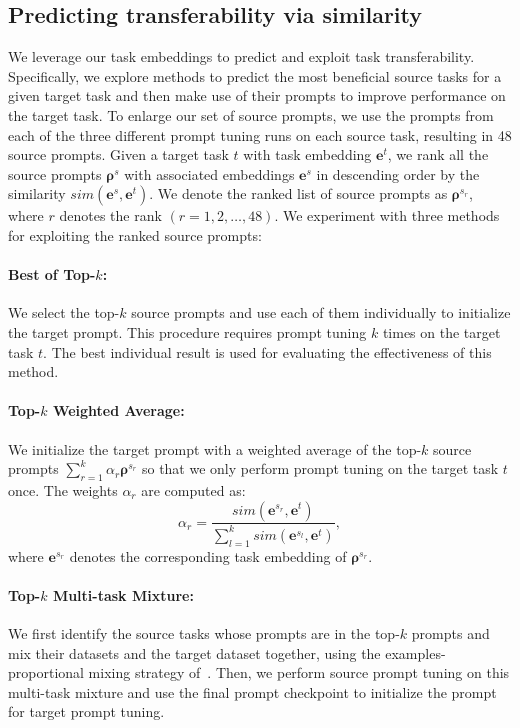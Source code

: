 \subsection{Predicting transferability via similarity}
\label{sec:predict_and_exploit}
We leverage our task embeddings to predict and exploit task transferability. Specifically, we explore methods to predict the most beneficial source tasks for a given target task and then make use of their prompts to improve performance on the target task. To enlarge our set of source prompts, we use the prompts from each of the three different prompt tuning runs on each source task, resulting in 48 source prompts. Given a target task $t$ with task embedding $\bm{e}^t$, we rank all the source prompts $\bm{\rho}^{s}$ with associated embeddings $\bm{e}^{s}$ in descending order by the similarity $sim(\bm{e}^{s}, \bm{e}^{t})$. We denote the ranked list of source prompts as $\bm{\rho}^{s_r}$, where $r$ denotes the rank $(r=1,2,\ldots, 48)$. We experiment with three methods for exploiting the ranked source prompts:

\paragraph{{\small \sc \textbf{Best of Top-$k$}}:} We select the top-$k$ source prompts and use each of them individually to initialize the target prompt. This procedure requires prompt tuning $k$ times on the target task $t$. The best individual result is used for evaluating the effectiveness of this method.

\paragraph{{\small \sc \textbf{Top-$k$ Weighted Average}}:} We initialize the target prompt with a weighted average of the \mbox{top-$k$} source prompts $\sum_{r=1}^{k} \alpha_{r} \bm{\rho}^{s_r}$ so that we only perform prompt tuning on the target task $t$ once. The weights $\alpha_{r}$ are computed as:
\[\alpha_{r} = \dfrac{sim(\bm{e}^{s_r}, \bm{e}^{t})}{\sum_{l=1}^{k} sim(\bm{e}^{s_l}, \bm{e}^{t})},
\]
where $\bm{e}^{s_r}$ denotes the corresponding task embedding of $\bm{\rho}^{s_r}$.

\paragraph{{\small \sc \textbf{Top-$k$ Multi-task Mixture}}:} We first identify the source tasks whose prompts are in the \mbox{top-$k$} prompts and mix their datasets and the target dataset together, using the examples-proportional mixing strategy of~\citet{CRaffel20}. Then, we perform source prompt tuning on this multi-task mixture and use the final prompt checkpoint to initialize the prompt for target prompt tuning.


